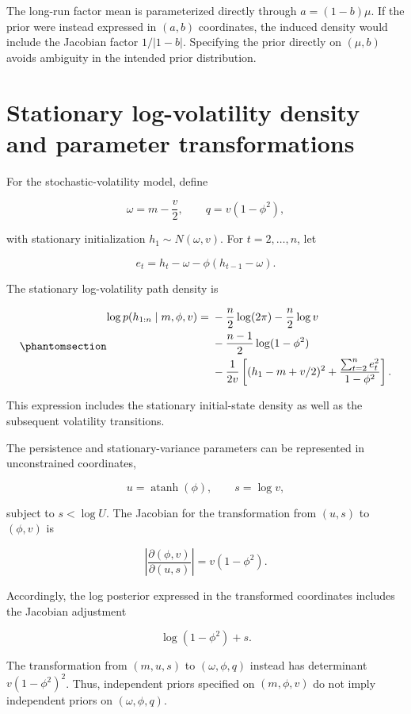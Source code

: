 \documentclass[
  12pt,
  letterpaper,
  DIV=11,
  numbers=noendperiod]{scrreprt}
\begin{document}
The long-run factor mean is parameterized directly through
\(a=(1-b)\mu\). If the prior were instead expressed in \((a,b)\)
coordinates, the induced density would include the Jacobian factor
\(1/|1-b|\). Specifying the prior directly on \((\mu,b)\) avoids
ambiguity in the intended prior distribution.

\section{Stationary log-volatility density and parameter
transformations}\label{stationary-log-volatility-density-and-parameter-transformations}

For the stochastic-volatility model, define

\[
\omega=m-\frac v2,
\qquad
q=v(1-\phi^2),
\]

with stationary initialization \(h_1\sim N(\omega,v)\). For
\(t=2,\ldots,n\), let

\[
e_t=h_t-\omega-\phi(h_{t-1}-\omega).
\]

The stationary log-volatility path density is

\begin{equation}\protect\phantomsection\label{eq-finite-path}{
\begin{aligned}
\log p(h_{1:n}\mid m,\phi,v)
={}&-\frac n2\log(2\pi)
-\frac n2\log v\\
&-\frac{n-1}{2}\log(1-\phi^2)\\
&-\frac{1}{2v}
\left[
(h_1-m+v/2)^2
+\frac{\sum_{t=2}^{n}e_t^2}{1-\phi^2}
\right].
\end{aligned}
}\end{equation}

This expression includes the stationary initial-state density as well as
the subsequent volatility transitions.

The persistence and stationary-variance parameters can be represented in
unconstrained coordinates,

\[
u=\operatorname{atanh}(\phi),
\qquad s=\log v,
\]

subject to \(s<\log U\). The Jacobian for the transformation from
\((u,s)\) to \((\phi,v)\) is

\[
\left|
\frac{\partial(\phi,v)}{\partial(u,s)}
\right|
=v(1-\phi^2).
\]

Accordingly, the log posterior expressed in the transformed coordinates
includes the Jacobian adjustment

\[
\log(1-\phi^2)+s.
\]

The transformation from \((m,u,s)\) to \((\omega,\phi,q)\) instead has
determinant \(v(1-\phi^2)^2\). Thus, independent priors specified on
\((m,\phi,v)\) do not imply independent priors on \((\omega,\phi,q)\).
\end{document}

